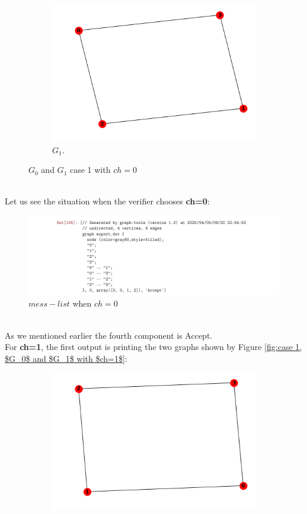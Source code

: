\documentclass[12pt,a4paper]{article}
\begin{document}
\begin{itemize}
\begin{figure}[h!]
\begin{subfigure}[b]{.4\linewidth}
		\includegraphics[width=\linewidth]{3-4.png}
		\caption{$G_1$.}
	\end{subfigure}
	\caption{$G_0$ and $G_1$ case 1 with $ch=0$}
	\label{fig:case 1,$G_0$ and $G_1$ with $ch=0$}
      \end{figure}\\
Let us see the situation when the verifier chooses \textbf{ch=0}:\\
 \begin{figure}[h]
 	\centering
 	\includegraphics[width=1.25\linewidth]{3-5}
 	\caption{$mess-list$ when $ch=0$}
 	\label{fig:3-5}
 \end{figure}\\
As we mentioned earlier the fourth component is Accept.\\
For \textbf{ch=1}, the first output is printing the two graphs shown by Figure \ref{fig:case 1, $G_0$ and $G_1$ with $ch=1$}:
\begin{figure}[h!]
	\centering\begin{subfigure}[b]{.35\linewidth}
		\includegraphics[width=\linewidth]{3-6.png}

\end{subfigure}
\end{figure}
\end{itemize}
\end{document}
